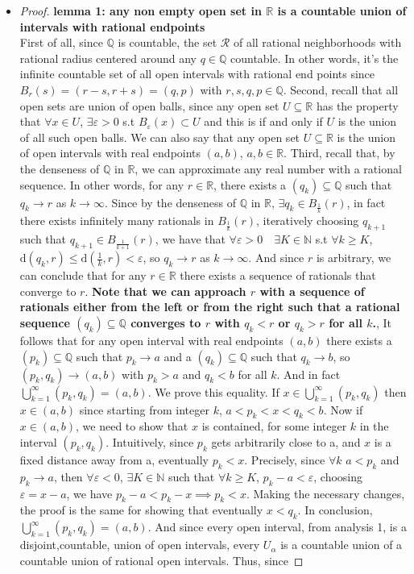 \documentclass[12pt]{article}
\newcommand{\RR}{\mathbb{R}}
\newcommand{\NN}{\mathbb{N}}
\newcommand{\QQ}{\mathbb{Q}}
\begin{document}
\begin{itemize}
        \item[6.]
        \begin{proof}
        \textbf{lemma 1: any non empty open set in $\RR$ is a countable union of intervals with rational endpoints }\\
        First of all, since $\QQ$ is countable, the set $\mathcal{R}$ of all rational neighborhoods with rational radius centered around any $q \in \QQ$ countable. In other words, it's the infinite countable set of all open intervals with rational end points since $B_{r} (s ) = (r-s,r+s) = (q,p)$ with $r,s,q,p \in \QQ$. Second, recall that all open sets are union of open balls, since any open set $U \subseteq \RR$ has the property that $\forall x \in U$, $\exists \varepsilon > 0$ s.t $B_\varepsilon(x) \subset U$ and this is if and only if $U$ is the union of all such open balls. We can also say that any open set $U \subseteq \RR$ is the union of open intervals with real endpoints $(a,b)$, $a,b \in \RR$. Third, recall that, by the denseness of $\QQ$ in $\RR$, we can approximate any real number with a rational sequence. In other words, for any $r \in \RR$, there exists a $(q_k) \subseteq \QQ$ such that $q_k \to r$ as $k \to \infty$. Since by the denseness of $\QQ$ in $\RR$, $\exists q_k \in B_{\tfrac{1}{k}} (r)$, in fact there exists infinitely many rationals in $B_{\tfrac{1}{k}} (r)$, iteratively choosing $q_{k+1}$ such that $q_{k+1} \in B_{\tfrac{1}{k+1}} (r)$, we have that $\forall \varepsilon > 0 \quad  \exists K \in \NN$ s.t $\forall k \geq K$,  $\text{d} (q_k, r) \leq \text{d}(\frac{1}{k} , r) < \varepsilon$, so $q_k \to r $ as $k \to \infty$. And since $r$ is arbitrary, we can conclude that for any $r \in \RR$ there exists a sequence of rationals that converge to $r$. \textbf{Note that we can approach $r$ with a sequence of rationals either from the left or from the right such that a rational sequence $(q_k) \subseteq \QQ$ converges to $r$ with $q_k < r $ or $q_k > r$ for all $k$.}, It follows that for any open interval with real endpoints $(a,b)$ there exists a $(p_k) \subseteq \QQ$ such that $p_k \to a$ and a $(q_k) \subseteq \QQ$ such that $q_k \to b$, so $(p_k, q_k) \to (a,b)$ with $p_k > a$ and $q_k < b$ for all $k$. And in fact $\displaystyle \bigcup_{k = 1}^{\infty} (p_k, q_k)  = (a,b)$. We prove this equality. If $x \in \bigcup_{k = 1}^{\infty} (p_k, q_k)$ then $x \in (a,b)$ since starting from integer $k$, $a< p_k < x < q_k < b$. Now if $x \in (a,b)$, we need to show that $x$ is contained, for some integer $k$ in the interval $(p_k, q_k)$. Intuitively, since $p_k$ gets arbitrarily close to a, and $x$ is a fixed distance away from a, eventually $p_k < x$. Precisely, since $\forall k$ $a<p_k$ and $p_k \to a $, then $\forall \varepsilon < 0 $, $\exists K \in \NN$ such that $\forall k \geq K$, $p_k - a < \varepsilon$, choosing $\varepsilon = x-a$, we have $p_k - a < p_k - x \implies p_k < x$. Making the necessary changes, the proof is the same for showing that eventually $x < q_k$. In conclusion,  $\displaystyle \bigcup_{k = 1}^{\infty} (p_k, q_k)  = (a,b)$. And since every open interval, from analysis 1, is a disjoint,countable, union of open intervals, every $U_\alpha$ is a countable union of a countable union of rational open intervals. Thus, since 
\end{proof}
\end{itemize}
\end{document}
